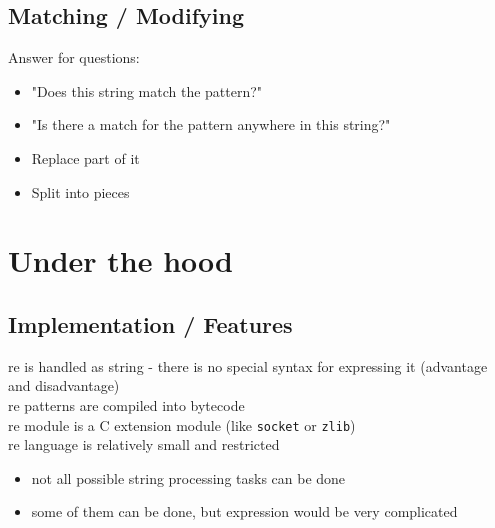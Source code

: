 \documentclass{beamer}
\begin{document}
\subsection{Matching / Modifying}
\begin{frame}
Answer for questions:
 \begin{itemize}
  \item "Does this string match the pattern?"
  \item "Is there a match for the pattern anywhere in this string?"
 \end{itemize}
 \pause
 \begin{itemize}
  \item Replace part of it
  \item Split into pieces
 \end{itemize}
\end{frame}

\section{Under the hood}
\subsection{Implementation / Features}
\begin{frame}[fragile]
 re is handled as string  - there is no special syntax for expressing it (advantage and disadvantage) \\
 \pause
 re patterns are compiled into bytecode \\
 \pause
 re module is a C extension module (like \verb/socket/ or \verb/zlib/) \\
 \pause
 re language is relatively small and restricted
 \pause
 \begin{itemize}
  \item not all possible string processing tasks can be done
  \item some of them can be done, but expression would be very complicated
 \end{itemize}
\end{frame}
\end{document}
